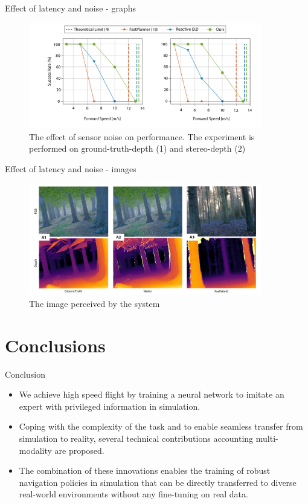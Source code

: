 \documentclass{beamer}
\begin{document}
\begin{frame}{Effect of latency and noise - graphs}
	\begin{figure}
		\includegraphics[width=4in]{images/noise-graph.png}
		\caption{The effect of sensor noise on performance. The experiment is performed on ground-truth-depth (1) and stereo-depth (2)}
	\end{figure}
\end{frame}

\begin{frame}{Effect of latency and noise - images}
	\begin{figure}
		\includegraphics[width=4in]{images/stimulation and stereo.png}
		\caption{The image perceived by the system}
	\end{figure}
\end{frame}

\section{Conclusions}
\begin{frame}{Conclusion}
	\begin{itemize}
		\item We achieve high speed flight by training a neural network to imitate an expert with privileged information in simulation.
		
		\item Coping with the complexity of the task and to enable seamless transfer from simulation to reality, several technical contributions accounting multi-modality are proposed.
		
		\item The combination of these innovations enables the training of robust navigation policies in simulation that can be directly transferred to diverse real-world environments without any fine-tuning on real data.
	\end{itemize}
	
	
\end{frame}
\end{document}

